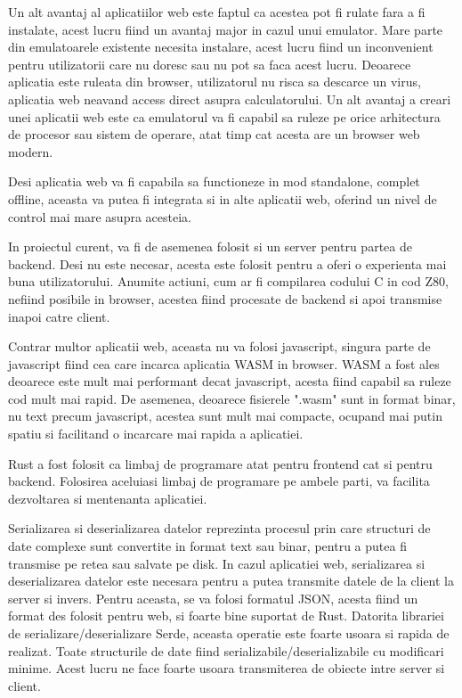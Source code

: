 \documentclass[titlepage,12pt]{article}
\begin{document}
Un alt avantaj al aplicatiilor web este faptul ca acestea pot fi rulate fara a fi instalate, acest lucru fiind un avantaj major in cazul unui emulator.
Mare parte din emulatoarele existente necesita instalare, acest lucru fiind un inconvenient pentru utilizatorii care nu doresc sau nu pot sa faca acest lucru.
Deoarece aplicatia este ruleata din browser, utilizatorul nu risca sa descarce un virus, aplicatia web neavand access direct asupra calculatorului.
Un alt avantaj a creari unei aplicatii web este ca emulatorul va fi capabil sa ruleze pe orice arhitectura de procesor sau sistem de operare, atat timp cat acesta are un browser web modern.

Desi aplicatia web va fi capabila sa functioneze in mod standalone, complet offline, aceasta va putea fi integrata si in alte aplicatii web, oferind un nivel de control mai mare asupra acesteia.

In proiectul curent, va fi de asemenea folosit si un server pentru partea de backend. Desi nu este necesar, acesta este folosit pentru a oferi o experienta mai buna utilizatorului.
Anumite actiuni, cum ar fi compilarea codului C in cod Z80, nefiind posibile in browser, acestea fiind procesate de backend si apoi transmise inapoi catre client.

Contrar multor aplicatii web, aceasta nu va folosi javascript, singura parte de javascript fiind cea care incarca aplicatia \ac {WASM} in browser.
\ac {WASM} a fost ales deoarece este mult mai performant decat javascript, acesta fiind capabil sa ruleze cod mult mai rapid. De asemenea, deoarece fisierele ".wasm" sunt in format binar,
nu text precum javascript, acestea sunt mult mai compacte, ocupand mai putin spatiu si facilitand o incarcare mai rapida a aplicatiei.

\ac {Rust} a fost folosit ca limbaj de programare atat pentru frontend cat si pentru backend.
Folosirea aceluiasi limbaj de programare pe ambele parti, va facilita dezvoltarea si mentenanta aplicatiei.

Serializarea si deserializarea datelor reprezinta procesul prin care structuri de date complexe sunt convertite in format text sau binar, pentru a putea fi transmise pe retea sau salvate pe disk.
In cazul aplicatiei web, serializarea si deserializarea datelor este necesara pentru a putea transmite datele de la client la server si invers.
Pentru aceasta, se va folosi formatul JSON, acesta fiind un format des folosit pentru web, si foarte bine suportat de \ac {Rust}.
Datorita librariei de serializare/deserializare Serde, aceasta operatie este foarte usoara si rapida de realizat.
Toate structurile de date fiind serializabile/deserializabile cu modificari minime.
Acest lucru ne face foarte usoara transmiterea de obiecte intre server si client.
\end{document}
